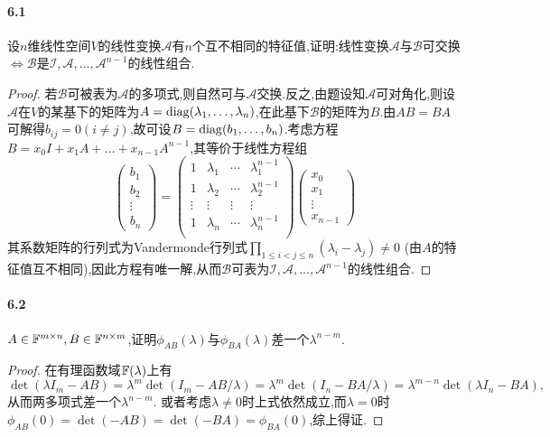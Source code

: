 \documentclass[11pt]{article}
\begin{document}
\paragraph{6.1}设$n$维线性空间$V$的线性变换$\mathscr{A}$有$n$个互不相同的特征值,证明:线性变换$\mathscr{A}$与$\mathscr{B}$可交换$\iff \mathscr{B}$是$\mathscr{I, A},\dots,\mathscr{A}^{n-1}$的线性组合.
\begin{proof}
    若$\mathscr{B}$可被表为$\mathscr{A}$的多项式,则自然可与$\mathscr{A}$交换.反之,由题设知$\mathscr{A}$可对角化,则设$\mathscr{A}$在$V$的某基下的矩阵为$A=\operatorname{diag}(\lambda_1,\dots,\lambda_n)$,在此基下$\mathscr{B}$的矩阵为$B$.由$AB=BA$可解得$b_{ij}=0 (i\neq j)$,故可设$B=\operatorname{diag}(b_1,\dots,b_n)$.考虑方程$B=x_0I+x_1A+\dots+x_{n-1}A^{n-1}$,其等价于线性方程组
    $$\begin{pmatrix}
        b_1\\ b_2 \\ \vdots \\ b_n
    \end{pmatrix}=\begin{pmatrix}
        1 & \lambda_1 & \cdots & \lambda_1^{n-1}\\
        1 & \lambda_2 & \cdots & \lambda_2^{n-1}\\
        \vdots & \vdots & \vdots & \vdots\\
        1 & \lambda_n & \cdots & \lambda_n^{n-1}\\
    \end{pmatrix}\begin{pmatrix}
        x_0\\ x_1 \\ \vdots \\ x_{n-1}
    \end{pmatrix}$$
    其系数矩阵的行列式为Vandermonde行列式$\prod_{1\leq i<j\leq n}(\lambda_i-\lambda_j)\neq 0$ (由$A$的特征值互不相同),因此方程有唯一解,从而$\mathscr{B}$可表为$\mathscr{I, A},\dots,\mathscr{A}^{n-1}$的线性组合.
\end{proof}
\paragraph{6.2}$A\in \mathbb{F}^{m\times n}, B\in \mathbb{F}^{n\times m}$,证明$\phi_{AB}(\lambda)$与$\phi_{BA}(\lambda)$差一个$\lambda^{n-m}$.
\begin{proof}
    在有理函数域$\mathbb{F}(\lambda)$上有
    $$\det(\lambda I_m -AB)=\lambda^m \det(I_m-AB/\lambda)=\lambda^m\det(I_n-BA/\lambda)=\lambda^{m-n}\det(\lambda I_n-BA),$$
    从而两多项式差一个$\lambda^{n-m}$. 或者考虑$\lambda\neq 0$时上式依然成立,而$\lambda=0$时$\phi_{AB}(0)=\det(-AB)=\det(-BA)=\phi_{BA}(0)$,综上得证.
\end{proof}
\end{document}
